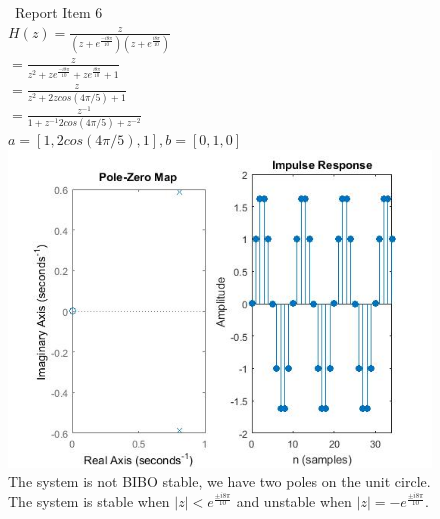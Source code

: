 \documentclass{article}
\begin{document}
\begin{figure}[H]
\ Report Item 6
\\ $H(z) = \frac{z}{{(z+e^{\frac{-i8\pi}{10}})(z+e^{\frac{i8\pi}{10}})}}$
\\ $ = \frac{z}{z^2 + ze^{\frac{-i8\pi}{10}} + ze^{\frac{i8\pi}{10}} + 1}$
\\ $ = \frac{z}{z^2+2zcos(4\pi/5) + 1}$
\\ $ = \frac{z^{-1}}{1 + z^{-1}2cos(4\pi/5) + z^{-2}}$
\\ $ a = [1,2cos(4\pi/5),1], b = [0,1,0]$
\includegraphics[scale = .5]{report6}
\\ The system is not BIBO stable, we have two poles on the unit circle.  The system is stable when $|z| < e^{\frac{\pm i8\pi}{10}}$ and unstable when $|z| =  - e^{\frac{\pm i8\pi}{10}}$.
\end{figure}



\break
\end{document}
